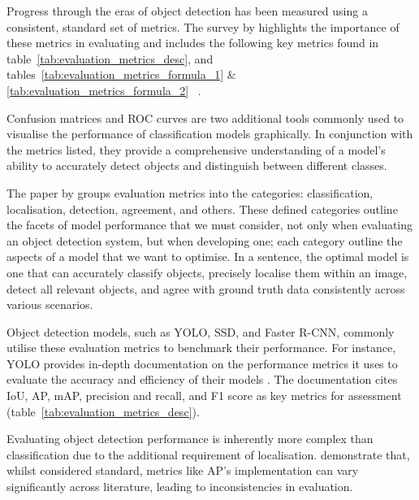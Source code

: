 Progress through the eras of object detection has been measured using a
consistent, standard set of metrics. The survey by
\citeauthor{zou2025comprehensive} highlights the importance of these metrics in
evaluating and includes the following key metrics found in
table~\ref{tab:evaluation_metrics_desc}, and
tables~\ref{tab:evaluation_metrics_formula_1} \&
\ref{tab:evaluation_metrics_formula_2} ~\citep{zou2025comprehensive}.

Confusion matrices and ROC curves are two additional tools commonly used to
visualise the performance of classification models graphically. In conjunction
with the metrics listed, they provide a comprehensive understanding of a
model's ability to accurately detect objects and distinguish between different
classes.

The paper by \cite{zou2025comprehensive} groups evaluation metrics into the
categories: classification, localisation, detection, agreement, and others.
These defined categories outline the facets of model performance that we must
consider, not only when evaluating an object detection system, but when
developing one; each category outline the aspects of a model that we want to
optimise. In a sentence, the optimal model is one that can accurately classify
objects, precisely localise them within an image, detect all relevant objects,
and agree with ground truth data consistently across various scenarios.

Object detection models, such as YOLO, SSD, and Faster R-CNN, commonly utilise
these evaluation metrics to benchmark their performance. For instance, YOLO
\citep{jocher2023yolo8} provides in-depth documentation on the performance
metrics it uses to evaluate the accuracy and efficiency of their models
\citep{ultralytics2025metrics}. The documentation cites IoU, AP, mAP, precision
and recall, and F1 score as key metrics for assessment
(table~\ref{tab:evaluation_metrics_desc}).

Evaluating object detection performance is inherently more complex than
classification due to the additional requirement of localisation.
\cite{padilla2020survey} demonstrate that, whilst considered standard, metrics
like AP's implementation can vary significantly across literature, leading to
inconsistencies in evaluation.

